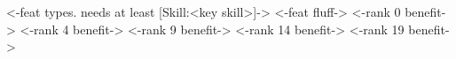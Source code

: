 { <-feat types. needs at least [Skill:<key skill>]-> }
{ <-feat fluff-> }
{ <-rank 0 benefit-> }
{ <-rank 4 benefit-> }
{ <-rank 9 benefit-> }
{ <-rank 14 benefit-> }
{ <-rank 19 benefit-> }
